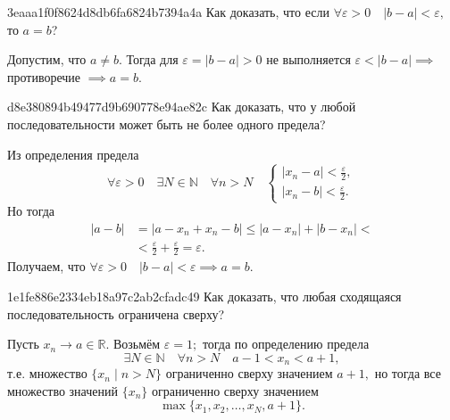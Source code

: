     \begin{note}{3eaaa1f0f8624d8db6fa6824b7394a4a}
        Как доказать, что если \( \forall \varepsilon > 0 \quad |b - a| <
        \varepsilon, \) то \( a = b \)?

        \begin{cloze}{1}
            Допустим, что \( a \neq b. \) Тогда для \( \varepsilon = |b - a| > 0
            \) не выполняется \( \varepsilon < |b - a| \implies \) противоречие
            \( \implies a = b. \)
        \end{cloze}
    \end{note}

    \begin{note}{d8e380894b49477d9b690778e94ae82c}
        Как доказать, что у любой последовательности может быть не более одного
        предела?

        \begin{cloze}{1}
            Из определения предела \[
                \forall \varepsilon > 0 \quad \exists N \in \mathbb N \quad \forall n > N \quad
                \begin{cases}
                    |x_n - a| < \frac{\varepsilon}{2}, \\
                    |x_n - b| < \frac{\varepsilon}{2}.
                \end{cases}
            \]
            Но тогда \[
                \begin{aligned}
                    |a - b| &= |a - x_n + x_n - b| \leqslant |a - x_n| + |b - x_n| < \\
                            &< \frac{\varepsilon}{2} +
                            \frac{\varepsilon}{2} = \varepsilon.
                \end{aligned}
            \]
            Получаем, что \(
                \forall \varepsilon > 0 \quad |b - a| <
                \varepsilon \implies a = b.
            \)
        \end{cloze}
    \end{note}

    \begin{note}{1e1fe886e2334eb18a97c2ab2cfadc49}
        Как доказать, что любая сходящаяся последовательность ограничена сверху?

        \begin{cloze}{1}
            Пусть \( x_n \to a \in \mathbb R. \) Возьмём \( \varepsilon = 1; \)
            тогда по определению предела \[
                \exists N \in \mathbb N \quad \forall n > N \quad a -
                1 < x_n < a + 1,
            \] т.е. множество \( \{ x_n \mid n > N \} \) ограниченно сверху
            значением \( a + 1, \) но тогда все множество значений \( \{ x_n  \} \)  ограниченно
            сверху значением \[
                \max \{ x_1, x_2, \ldots, x_N, a + 1 \}.
            \]
        \end{cloze}
    \end{note}

